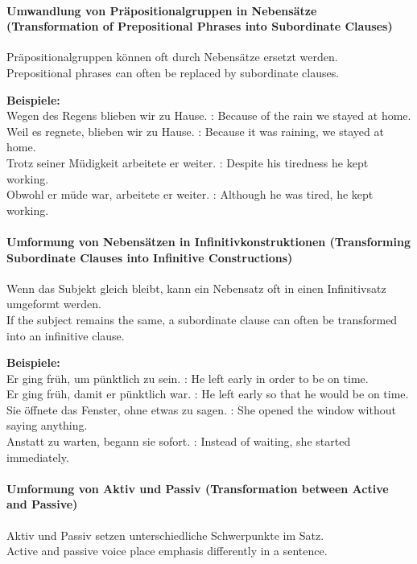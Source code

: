 \documentclass[a4paper]{article}
\begin{document}
        \paragraph{Umwandlung von Präpositionalgruppen in Nebensätze {\small (Transformation of Prepositional Phrases into Subordinate Clauses)}}
            Präpositionalgruppen können oft durch Nebensätze ersetzt werden.\\
            Prepositional phrases can often be replaced by subordinate clauses.
            
            \textbf{Beispiele:}\\
            Wegen des Regens blieben wir zu Hause. : Because of the rain we stayed at home.\\
            Weil es regnete, blieben wir zu Hause. : Because it was raining, we stayed at home.\\
            Trotz seiner Müdigkeit arbeitete er weiter. : Despite his tiredness he kept working.\\
            Obwohl er müde war, arbeitete er weiter. : Although he was tired, he kept working.
        
        \paragraph{Umformung von Nebensätzen in Infinitivkonstruktionen {\small (Transforming Subordinate Clauses into Infinitive Constructions)}}
            Wenn das Subjekt gleich bleibt, kann ein Nebensatz oft in einen Infinitivsatz umgeformt werden.\\
            If the subject remains the same, a subordinate clause can often be transformed into an infinitive clause.
            
            \textbf{Beispiele:}\\
            Er ging früh, um pünktlich zu sein. : He left early in order to be on time.\\
            Er ging früh, damit er pünktlich war. : He left early so that he would be on time.\\
            Sie öffnete das Fenster, ohne etwas zu sagen. : She opened the window without saying anything.\\
            Anstatt zu warten, begann sie sofort. : Instead of waiting, she started immediately.
        
        \paragraph{Umformung von Aktiv und Passiv {\small (Transformation between Active and Passive)}}
            Aktiv und Passiv setzen unterschiedliche Schwerpunkte im Satz.\\
            Active and passive voice place emphasis differently in a sentence.
            
\end{document}
